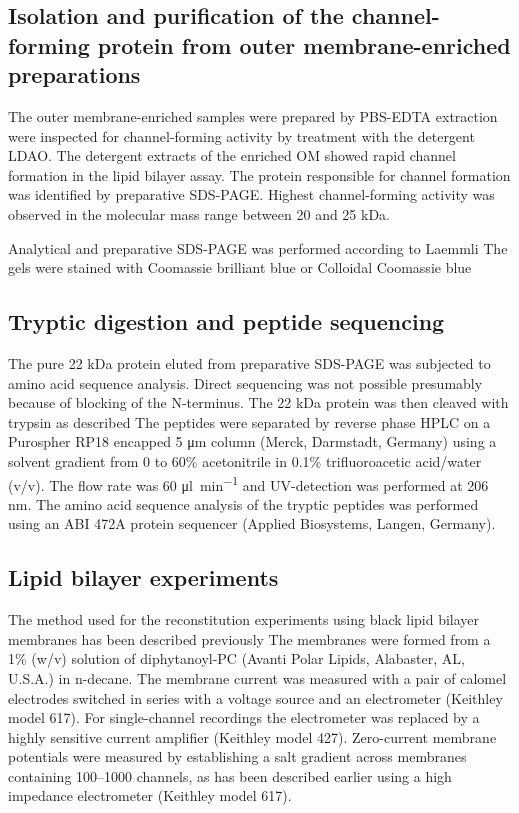\subsection{Isolation and purification of the channel-forming protein from outer
  membrane-enriched preparations}
\label{sub:porin_isolation}
The outer membrane-enriched samples were prepared by \ac{PBS}-\ac{EDTA} extraction were inspected for channel-forming activity by treatment with the detergent \ac{LDAO}. The detergent extracts of the enriched OM showed rapid channel formation in the lipid bilayer assay. The protein responsible for channel formation was identified by preparative \ac{SDS-PAGE}. Highest channel-forming activity was observed in the molecular mass range between 20 and 25 kDa.

Analytical and preparative \ac{SDS-PAGE} was performed according to Laemmli The gels were stained with Coomassie brilliant blue or Colloidal Coomassie blue 

\subsection{Tryptic digestion and peptide sequencing}
\label{sub:porin_tryptic}
The pure 22 kDa protein eluted from preparative \ac{SDS-PAGE} was subjected to amino acid sequence analysis. Direct sequencing was not possible presumably because of blocking of the N-terminus. The 22 kDa protein was then cleaved with trypsin as described The peptides were separated by reverse phase HPLC on a Purospher RP18 encapped 5 \si{\micro\metre} column (Merck, Darmstadt, Germany) using a solvent gradient from 0 to 60\% acetonitrile in 0.1\% trifluoroacetic acid/water (v/v). The flow rate was 60 \si{\micro\litre\per\minute} and UV-detection was performed at 206 \si{\nano\metre}. The amino acid sequence analysis of the tryptic peptides was performed using an ABI 472A protein sequencer (Applied Biosystems, Langen, Germany).

\subsection{Lipid bilayer experiments}
\label{sub:porin_bilayer}
The method used for the reconstitution experiments using black lipid bilayer
membranes has been described previously The
membranes were formed from a 1\% (w/v) solution of diphytanoyl-\ac{PC} (Avanti
Polar Lipids, Alabaster, AL, U.S.A.) in n-decane. The membrane current was
measured with a pair of calomel electrodes switched in series with a voltage
source and an electrometer (Keithley model 617). For single-channel recordings the electrometer was replaced by a highly sensitive current amplifier (Keithley model 427). Zero-current membrane potentials were measured by establishing a salt gradient across membranes containing 100--1000 channels, as has been described earlier using a high impedance electrometer (Keithley model 617).

